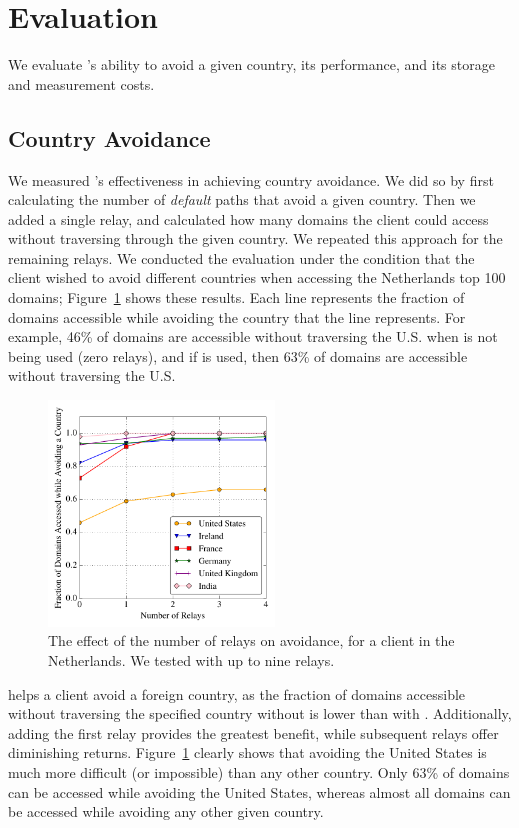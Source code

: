 \section{Evaluation}

We evaluate \system{}'s ability to avoid a given country, its performance,
and its storage and measurement costs.

\subsection{Country Avoidance}

We measured \system{}'s effectiveness in achieving country avoidance.  We did so by first 
calculating the number of {\it default} paths that avoid a given country.  Then 
we added a single relay, and calculated how many domains the client could 
access without traversing through the given country.  We repeated this approach for 
the remaining relays.  We conducted the evaluation under the condition that 
the client wished to avoid different countries when accessing the Netherlands top 
100 domains; Figure~\ref{fig:avoidance_eval} shows these results.  Each 
line represents the fraction of domains accessible while avoiding the country that 
the line represents.  For example, 46\% of domains are accessible without traversing 
the U.S. when \system{} is not being used (zero relays), and if \system{} is 
used, then 63\% of domains are accessible without traversing the U.S.

\begin{figure}[t!]
\tiny
\centering
\includegraphics[width=.5\textwidth,height=6cm]{avoidance_n_relays}
\caption{The effect of the number of relays on avoidance, for a client
  in the Netherlands. We tested \system{} with up to nine relays.}
\label{fig:avoidance_eval}
\end{figure}

\system{} helps a client avoid a foreign country,
as the fraction of domains accessible without traversing the specified
country without \system{} is lower than with \system{}.  Additionally,
adding the first relay provides the greatest benefit, while subsequent
relays offer diminishing returns.  Figure~\ref{fig:avoidance_eval}
clearly shows that avoiding the United States is much more difficult (or
impossible) than any other country.  Only 63\% of domains can be
accessed while avoiding the United States, whereas almost all domains can be
accessed while avoiding any other given country.

